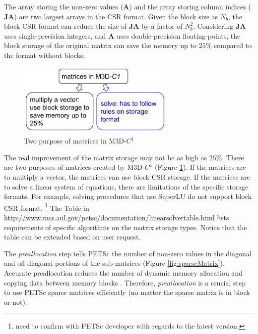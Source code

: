 \documentclass[11pt]{article}  %
\begin{document}
The array storing the non-zero values ($\mathbf{A}$) and the array storing column indices ($\mathbf{JA}$) are two largest arrays in the CSR format.  Given the block size as $N_b$, the block CSR format can reduce the size of $\mathbf{JA}$ by a factor of $N_b^2$.  Considering $\mathbf{JA}$ uses single-precision integers, and $\mathbf{A}$ uses double-precision floating-points, the block storage of the original matrix can save the memory up to $25\%$ compared to the format without blocks.  

\begin{figure}
\center
\includegraphics[width=3in]{fig/matTypes.png}
\caption{\small{Two purpose of matrices in M3D-$C^1$}} 
\label{fig:matTypes.png}
\end{figure}

The real improvement of the matrix storage may not be as high as $25\%$. There are two purposes of matrices created by M3D-$C^1$ (Figure \ref{fig:matTypes.png}). If the matrices are to multiply a vector, the matrices can use block CSR storage. If the matrices are to solve a linear system of equations, there are limitations of the specific storage formats. For example,  solving procedures that use SuperLU  do not support block CSR format. \footnote{need to confirm with PETSc developer with regards to the latest version.} The Table in \url{http://www.mcs.anl.gov/petsc/documentation/linearsolvertable.html} lists requirements of  specific algorithms on the matrix storage types. Notice that the table can be extended based on user request. 

The  \emph{preallocation} step tells PETSc the number of non-zero values in the diagonal and off-diagonal portions of the sub-matrices (Figure \ref{fig:sparseMatrix}).  Accurate  preallocation reduces the number of dynamic memory allocation and copying data between memory blocks \cite{petsc-web-page}. Therefore, \emph{preallocation} is a crucial step to use  PETSc sparse matrices efficiently (no matter the sparse matrix is in block or not).
\end{document}
